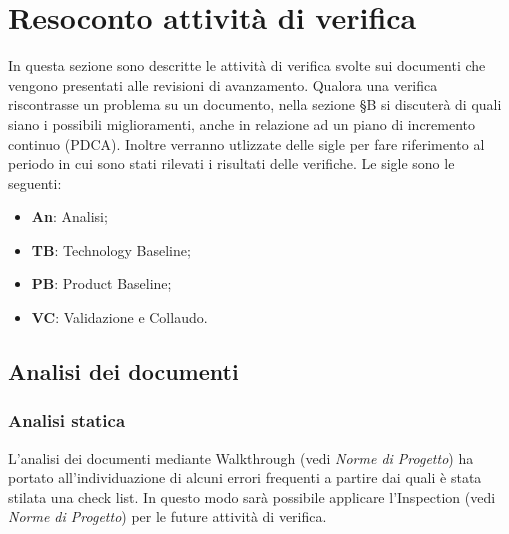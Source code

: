 \section{Resoconto attività di verifica}
In questa sezione sono descritte le attività di verifica svolte sui documenti che vengono presentati alle revisioni di avanzamento. Qualora una verifica riscontrasse un problema su un documento, nella sezione \S B si discuterà di quali siano i possibili miglioramenti, anche in relazione ad un piano di incremento continuo (PDCA).
Inoltre verranno utlizzate delle sigle per fare riferimento al periodo in cui sono stati rilevati i risultati delle verifiche. Le sigle sono le seguenti:
\begin{itemize}
\item \textbf{An}: Analisi;
\item \textbf{TB}: Technology Baseline;
\item \textbf{PB}: Product Baseline;
\item \textbf{VC}: Validazione e Collaudo. 
\end{itemize}

\subsection{Analisi dei documenti}
\subsubsection{Analisi statica}
L'analisi dei documenti mediante Walkthrough (vedi \textit{Norme di Progetto}) ha portato all'individuazione di alcuni errori frequenti a partire dai quali è stata stilata una check list. In questo modo sarà possibile applicare l’Inspection (vedi \textit{Norme di Progetto}) per le future attività di verifica.



